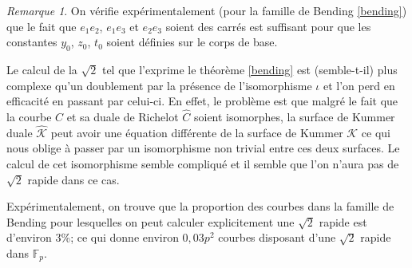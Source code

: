 \documentclass[a4paper,12pt]{article}
\newtheorem{lemme}[theoreme]{Lemme}
\newtheorem{corollaire}[theoreme]{Corollaire}
\theoremstyle{definition}
\theoremstyle{remark}
\newtheorem{remarque}{Remarque}
\numberwithin{equation}{section}
\begin{document}
%
%
%
%
%
\begin{remarque}
On vérifie expérimentalement (pour la famille de Bending \ref{bending}) que le fait que $e_1e_2$, $e_1e_3$ et $e_2e_3$ soient des carrés est suffisant pour que les constantes $y_0$, $z_0$, $t_0$ soient définies sur le corps de base.
\end{remarque}

Le calcul de la $\sqrt{2}$ tel que l'exprime le théorème \ref{bending} est (semble-t-il) plus complexe qu'un doublement par la présence de l'isomorphisme $\iota$ et l'on perd en efficacité en passant par celui-ci.
En effet, le problème est que malgré le fait que la courbe $C$ et sa duale de Richelot $\hat{C}$ soient isomorphes, la surface de Kummer duale $\hat{\mathcal{K}}$ peut avoir une équation différente de la surface de Kummer $\mathcal{K}$ ce qui nous oblige à passer par un isomorphisme non trivial entre ces deux surfaces.
Le calcul de cet isomorphisme semble compliqué et il semble que l'on n'aura pas de $\sqrt{2}$ rapide dans ce cas.

Expérimentalement, on trouve que la proportion des courbes dans la famille de Bending pour lesquelles on peut calculer explicitement une $\sqrt{2}$ rapide est d'environ 3\%; ce qui donne environ $0,03p^2$ courbes disposant d'une $\sqrt{2}$ rapide dans $\mathbb{F}_p$.
\end{document}
